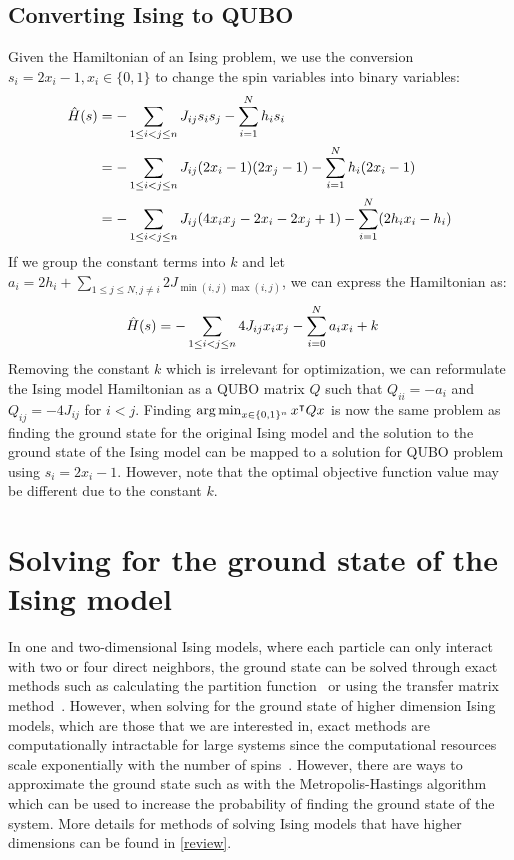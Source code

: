 \subsection{Converting Ising to QUBO}
Given the Hamiltonian of an Ising problem, we use the conversion $s_i = 2x_i - 1, x_i \in \{0, 1\}$ to change the spin variables into binary variables:
\begin{align}
    \Hat{H}(s) &= -\sum_{1\leq i < j \leq n} J_{ij}s_i s_j - \sum_{i=1}^N h_i s_i \nonumber\\
    &= -\sum_{1\leq i < j \leq n} J_{ij}(2x_i - 1) (2x_j - 1) - \sum_{i=1}^N h_i (2x_i - 1) \nonumber\\
    &= -\sum_{1\leq i < j \leq n} J_{ij}(4x_i x_j - 2x_i - 2x_j + 1) - \sum_{i=1}^N (2h_i x_i - h_i) \nonumber
\end{align}
If we group the constant terms into $k$ and let $a_i = 2h_i + \sum_{1\leq j \leq N, j \neq i} 2J_{\min(i,j)\max(i,j)}$, we can express the Hamiltonian as:
\begin{align}
    \Hat{H}(s) &= -\sum_{1\leq i < j \leq n} 4J_{ij}x_i x_j - \sum_{i=0}^N a_{i}x_i + k \nonumber
\end{align}
Removing the constant $k$ which is irrelevant for optimization, we can reformulate the Ising model Hamiltonian as a QUBO matrix $Q$ such that $Q_{ii} = -a_i$ and $Q_{ij} = -4J_{ij}$ for $i < j$. Finding $\operatorname*{arg\,min}_{x \in \{0, 1\}^n} x^\intercal Q x$ is now the same problem as finding the ground state for the original Ising model and the solution to the ground state of the Ising model can be mapped to a solution for QUBO problem using $s_i = 2x_i - 1$. However, note that the optimal objective function value may be different due to the constant $k$.

\section{Solving for the ground state of the Ising model}
In one and two-dimensional Ising models, where each particle can only interact with two or four direct neighbors, the ground state can be solved through exact methods such as calculating the partition function~\cite{onsager} or using the transfer matrix method~\cite{kramerising}. However, when solving for the ground state of higher dimension Ising models, which are those that we are interested in, exact methods are computationally intractable for large systems since the computational resources scale exponentially with the number of spins~\cite{barahona1982computational}. However, there are ways to approximate the ground state such as with the Metropolis-Hastings algorithm \cite{metropolissampling} which can be used to increase the probability of finding the ground state of the system. More details for methods of solving Ising models that have higher dimensions can be found in \autoref{review}.

